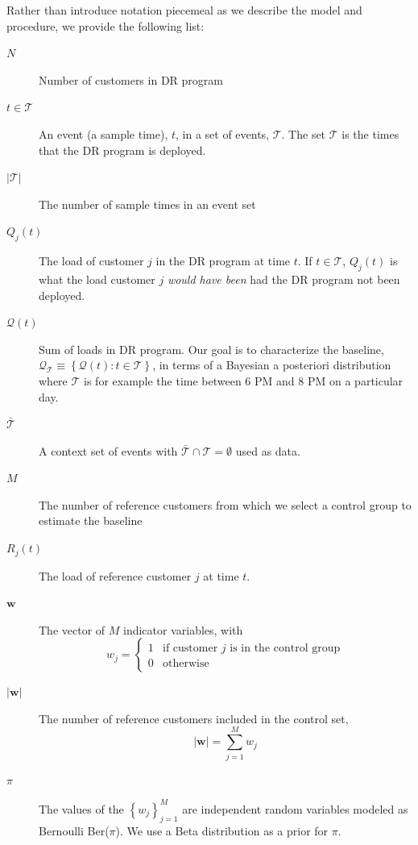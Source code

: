 \documentclass[journal]{IEEEtran}
\newcommand{\eventset}{\mathcal{T}}
\newcommand{\wvector}{\mathbf w}
\newcommand{\context}{{\bar {\mathcal{T}}}}
\newcommand{\drpower}{Q}
\newcommand{\sumdrpower}{{\mathcal{Q}}}
\newcommand{\referencepower}{R}
\begin{document}
Rather than introduce notation piecemeal as we describe the model and
procedure, we provide the following list:
\begin{description}
\item[$N$] Number of customers in DR program
\item[$t\in \eventset$] An event (a sample time), $t$, in a set of
  events, $\eventset$.  The set $\eventset$ is the times that the DR
  program is deployed.
\item[$\left| \eventset \right|$] The number of sample times in an
  event set
\item[$\drpower_j(t)$] The load of customer $j$ in the DR program at
  time $t$.  If $t\in \eventset$, $\drpower_j(t)$ is what the load
  customer $j$ \emph{would have been} had the DR program not been
  deployed.
\item[$\sumdrpower(t)$] Sum of loads in DR program.  Our goal is to
  characterize the baseline,
  $\sumdrpower_\eventset \equiv \left\{ \sumdrpower(t) : t \in \eventset
  \right\}$, in terms of a Bayesian a posteriori distribution where
  $\eventset$ is for example the time between 6 PM and 8 PM on a
  particular day.
\item[$\context$] A context set of events with $\context \cap
  \eventset = \emptyset$ used as data.
\item[$M$] The number of reference customers from which we select a
  control group to estimate the baseline
\item[$\referencepower_j(t)$] The load of reference customer $j$ at
  time $t$.
\item[$\wvector$] The vector of $M$ indicator variables,
  with
  \begin{equation*}
    w_j =
    \begin{cases}
      1 & \text{if customer } j \text{ is in the control group}\\
      0 & \text{otherwise}
    \end{cases}
  \end{equation*}
\item[$\left| \wvector \right|$] The number of reference customers
  included in the control set,
  \begin{equation*}
    \left| \wvector \right| = \sum_{j=1}^M w_j
  \end{equation*}
\item[$\pi$] The values of the $\left\{ w_j \right\}_{j=1}^M$ are
  independent random variables modeled as Bernoulli Ber($\pi$).  We
  use a Beta distribution as a prior for $\pi$.

\end{description}
\end{document}
